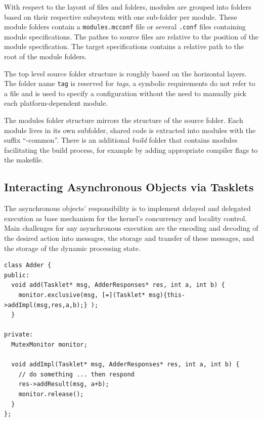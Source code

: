With respect to the layout of files and folders, modules are grouped into folders based on their respective subsystem with one sub-folder per module. These module folders contain a \texttt{modules.mcconf} file or several \texttt{.conf} files containing module specifications. The pathes to source files are relative to the position of the module specification. The target specifications contains a relative path to the root of the module folders.

The top level source folder structure is roughly based on the horizontal layers. The folder name \texttt{tag} is reserved for \emph{tags}, a symbolic requirements do not refer to a file and is used to specify a configuration without the need to manually pick each platform-dependent module.

The modules folder structure mirrors the structure of the source folder. Each module lives in its own subfolder, shared code is extracted into modules with the suffix ``-common''. There is an additional \emph{build} folder that contains modules facilitating the build process, for example by adding appropriate compiler flags to the makefile.

\subsection{Interacting Asynchronous Objects via Tasklets}
\label{sec:tasklet-impl}

The asynchronous objects' responsibility is to implement delayed and delegated execution as base mechanism for the kernel's concurrency and locality control. Main challenges for any asynchronous execution are the encoding and decoding of the desired action into messages, the storage and transfer of these messages, and the storage of the dynamic processing state.     


\begin{lstlisting}[float, label=lst:async-object, caption=An example asynchronous object.]
class Adder {
public:
  void add(Tasklet* msg, AdderResponses* res, int a, int b) {
    monitor.exclusive(msg, [=](Tasklet* msg){this->addImpl(msg,res,a,b);} );
  }

private:
  MutexMonitor monitor;

  void addImpl(Tasklet* msg, AdderResponses* res, int a, int b) {
    // do something ... then respond
    res->addResult(msg, a+b);
    monitor.release();
  }
};
\end{lstlisting}

